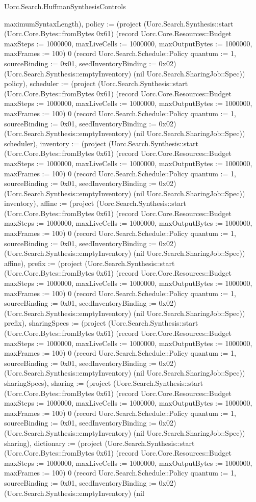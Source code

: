 \begin{lexlean}{Uorc.Search.HuffmanSynthesisControls}
\begin{semanticmodule}
{maximumSyntaxLength), policy := (project (Uorc.Search.Synthesis::start (Uorc.Core.Bytes::fromBytes 0x61) (record Uorc.Core.Resources::Budget {maxSteps := 1000000, maxLiveCells := 1000000, maxOutputBytes := 1000000, maxFrames := 100}) 0 (record Uorc.Search.Schedule::Policy {quantum := 1, sourceBinding := 0x01, seedInventoryBinding := 0x02}) (Uorc.Search.Synthesis::emptyInventory) (nil Uorc.Search.SharingJob::Spec)) policy), scheduler := (project (Uorc.Search.Synthesis::start (Uorc.Core.Bytes::fromBytes 0x61) (record Uorc.Core.Resources::Budget {maxSteps := 1000000, maxLiveCells := 1000000, maxOutputBytes := 1000000, maxFrames := 100}) 0 (record Uorc.Search.Schedule::Policy {quantum := 1, sourceBinding := 0x01, seedInventoryBinding := 0x02}) (Uorc.Search.Synthesis::emptyInventory) (nil Uorc.Search.SharingJob::Spec)) scheduler), inventory := (project (Uorc.Search.Synthesis::start (Uorc.Core.Bytes::fromBytes 0x61) (record Uorc.Core.Resources::Budget {maxSteps := 1000000, maxLiveCells := 1000000, maxOutputBytes := 1000000, maxFrames := 100}) 0 (record Uorc.Search.Schedule::Policy {quantum := 1, sourceBinding := 0x01, seedInventoryBinding := 0x02}) (Uorc.Search.Synthesis::emptyInventory) (nil Uorc.Search.SharingJob::Spec)) inventory), affine := (project (Uorc.Search.Synthesis::start (Uorc.Core.Bytes::fromBytes 0x61) (record Uorc.Core.Resources::Budget {maxSteps := 1000000, maxLiveCells := 1000000, maxOutputBytes := 1000000, maxFrames := 100}) 0 (record Uorc.Search.Schedule::Policy {quantum := 1, sourceBinding := 0x01, seedInventoryBinding := 0x02}) (Uorc.Search.Synthesis::emptyInventory) (nil Uorc.Search.SharingJob::Spec)) affine), prefix := (project (Uorc.Search.Synthesis::start (Uorc.Core.Bytes::fromBytes 0x61) (record Uorc.Core.Resources::Budget {maxSteps := 1000000, maxLiveCells := 1000000, maxOutputBytes := 1000000, maxFrames := 100}) 0 (record Uorc.Search.Schedule::Policy {quantum := 1, sourceBinding := 0x01, seedInventoryBinding := 0x02}) (Uorc.Search.Synthesis::emptyInventory) (nil Uorc.Search.SharingJob::Spec)) prefix), sharingSpecs := (project (Uorc.Search.Synthesis::start (Uorc.Core.Bytes::fromBytes 0x61) (record Uorc.Core.Resources::Budget {maxSteps := 1000000, maxLiveCells := 1000000, maxOutputBytes := 1000000, maxFrames := 100}) 0 (record Uorc.Search.Schedule::Policy {quantum := 1, sourceBinding := 0x01, seedInventoryBinding := 0x02}) (Uorc.Search.Synthesis::emptyInventory) (nil Uorc.Search.SharingJob::Spec)) sharingSpecs), sharing := (project (Uorc.Search.Synthesis::start (Uorc.Core.Bytes::fromBytes 0x61) (record Uorc.Core.Resources::Budget {maxSteps := 1000000, maxLiveCells := 1000000, maxOutputBytes := 1000000, maxFrames := 100}) 0 (record Uorc.Search.Schedule::Policy {quantum := 1, sourceBinding := 0x01, seedInventoryBinding := 0x02}) (Uorc.Search.Synthesis::emptyInventory) (nil Uorc.Search.SharingJob::Spec)) sharing), dictionary := (project (Uorc.Search.Synthesis::start (Uorc.Core.Bytes::fromBytes 0x61) (record Uorc.Core.Resources::Budget {maxSteps := 1000000, maxLiveCells := 1000000, maxOutputBytes := 1000000, maxFrames := 100}) 0 (record Uorc.Search.Schedule::Policy {quantum := 1, sourceBinding := 0x01, seedInventoryBinding := 0x02}) (Uorc.Search.Synthesis::emptyInventory) (nil }
\end{semanticmodule}
\end{lexlean}
